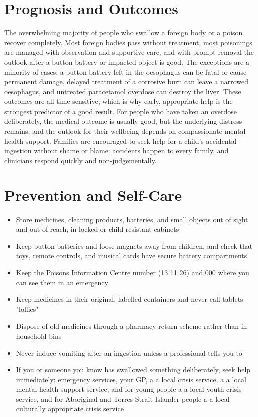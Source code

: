 \section*{Prognosis and Outcomes}
The overwhelming majority of people who swallow a foreign body or a poison recover completely. Most foreign bodies pass without treatment, most poisonings are managed with observation and supportive care, and with prompt removal the outlook after a button battery or impacted object is good. The exceptions are a minority of cases: a button battery left in the oesophagus can be fatal or cause permanent damage, delayed treatment of a corrosive burn can leave a narrowed oesophagus, and untreated paracetamol overdose can destroy the liver. These outcomes are all time-sensitive, which is why early, appropriate help is the strongest predictor of a good result. For people who have taken an overdose deliberately, the medical outcome is usually good, but the underlying distress remains, and the outlook for their wellbeing depends on compassionate mental health support. Families are encouraged to seek help for a child's accidental ingestion without shame or blame: accidents happen to every family, and clinicians respond quickly and non-judgementally.

\section*{Prevention and Self-Care}
\begin{itemize}
    \item Store medicines, cleaning products, batteries, and small objects out of sight and out of reach, in locked or child-resistant cabinets
    \item Keep button batteries and loose magnets away from children, and check that toys, remote controls, and musical cards have secure battery compartments
    \item Keep the Poisons Information Centre number (13 11 26) and 000 where you can see them in an emergency
    \item Keep medicines in their original, labelled containers and never call tablets "lollies"
    \item Dispose of old medicines through a pharmacy return scheme rather than in household bins
    \item Never induce vomiting after an ingestion unless a professional tells you to
    \item If you or someone you know has swallowed something deliberately, seek help immediately: emergency services, your GP, a a local crisis service, a a local mental-health support service, and for young people a a local youth crisis service, and for Aboriginal and Torres Strait Islander people a a local culturally appropriate crisis service
\end{itemize}

